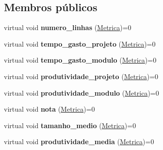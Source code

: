 \subsection*{\-Membros públicos}
\begin{DoxyCompactItemize}
\item 
\hypertarget{class_protocolo_metrica_a25f884c5349e9791d8f482c70e5758e5}{
virtual void {\bfseries numero\-\_\-linhas} (\hyperlink{class_metrica}{\-Metrica})=0}
\label{class_protocolo_metrica_a25f884c5349e9791d8f482c70e5758e5}

\item 
\hypertarget{class_protocolo_metrica_ac79ddc9645f304b502beb9bcac0c02d4}{
virtual void {\bfseries tempo\-\_\-gasto\-\_\-projeto} (\hyperlink{class_metrica}{\-Metrica})=0}
\label{class_protocolo_metrica_ac79ddc9645f304b502beb9bcac0c02d4}

\item 
\hypertarget{class_protocolo_metrica_ace1e8a26124c509054786c482cfecb8b}{
virtual void {\bfseries tempo\-\_\-gasto\-\_\-modulo} (\hyperlink{class_metrica}{\-Metrica})=0}
\label{class_protocolo_metrica_ace1e8a26124c509054786c482cfecb8b}

\item 
\hypertarget{class_protocolo_metrica_a1180e2c970d5e853d125e30c77fe1f0e}{
virtual void {\bfseries produtividade\-\_\-projeto} (\hyperlink{class_metrica}{\-Metrica})=0}
\label{class_protocolo_metrica_a1180e2c970d5e853d125e30c77fe1f0e}

\item 
\hypertarget{class_protocolo_metrica_a430351b35ef34d8ae90ea4d517af20be}{
virtual void {\bfseries produtividade\-\_\-modulo} (\hyperlink{class_metrica}{\-Metrica})=0}
\label{class_protocolo_metrica_a430351b35ef34d8ae90ea4d517af20be}

\item 
\hypertarget{class_protocolo_metrica_ab9cd9abb8cf1d6fcc65e271547267e9e}{
virtual void {\bfseries nota} (\hyperlink{class_metrica}{\-Metrica})=0}
\label{class_protocolo_metrica_ab9cd9abb8cf1d6fcc65e271547267e9e}

\item 
\hypertarget{class_protocolo_metrica_a27ce5bf3ade36e0af9624b5b59043eb2}{
virtual void {\bfseries tamanho\-\_\-medio} (\hyperlink{class_metrica}{\-Metrica})=0}
\label{class_protocolo_metrica_a27ce5bf3ade36e0af9624b5b59043eb2}

\item 
\hypertarget{class_protocolo_metrica_a6125a4e8a938b95f39e7901bd1e2a275}{
virtual void {\bfseries produtividade\-\_\-media} (\hyperlink{class_metrica}{\-Metrica})=0}
\label{class_protocolo_metrica_a6125a4e8a938b95f39e7901bd1e2a275}

\end{DoxyCompactItemize}


